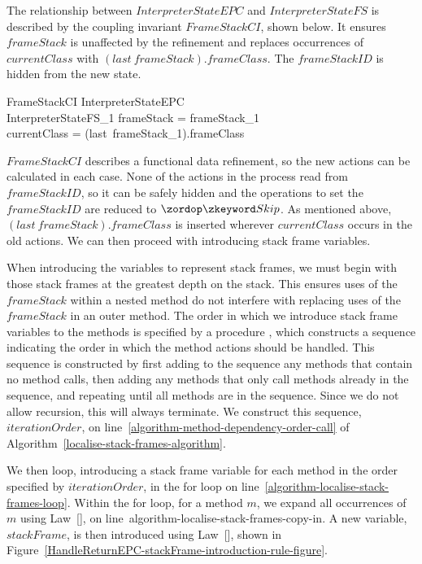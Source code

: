 The relationship between $InterpreterStateEPC$ and
$InterpreterStateFS$ is described by the coupling invariant
$FrameStackCI$, shown below.
It ensures $frameStack$ is unaffected by the refinement and replaces
occurrences of $currentClass$ with $(last~frameStack).frameClass$.
The $frameStackID$ is hidden from the new state.
\begin{schema}{FrameStackCI}
  InterpreterStateEPC \\
  InterpreterStateFS_1
\where
  frameStack = frameStack_1 \\
  currentClass = (last~frameStack_1).frameClass
\end{schema}

$FrameStackCI$ describes a functional data refinement, so the new
actions can be calculated in each case.
None of the actions in the process read from $frameStackID$, so it can
be safely hidden and the operations to set the $frameStackID$ are
reduced to $\Skip$.
As mentioned above, $(last~frameStack).frameClass$ is inserted
wherever $currentClass$ occurs in the old actions.
We can then proceed with introducing stack frame variables.

When introducing the variables to represent stack frames, we must
begin with those stack frames at the greatest depth on the stack.
This ensures uses of the $frameStack$ within a nested method do not
interfere with replacing uses of the $frameStack$ in an outer method.
The order in which we introduce stack frame variables to the methods
is specified by a procedure ,
which constructs a sequence indicating the order in which the method
actions should be handled.
This sequence is constructed by first adding to the sequence any
methods that contain no method calls, then adding any methods that
only call methods already in the sequence, and repeating until all
methods are in the sequence.
Since we do not allow recursion, this will always terminate.
We construct this sequence, $iterationOrder$, on
line~\ref{algorithm-method-dependency-order-call} of
Algorithm~\ref{localise-stack-frames-algorithm}.

We then loop, introducing a stack frame variable for each method in
the order specified by $iterationOrder$, in the for loop on
line~\ref{algorithm-localise-stack-frames-loop}.
Within the for loop, for a method $m$, we expand all occurrences of
$m$ using Law~[], on
line~{algorithm-localise-stack-frames-copy-in}.
A new variable, $stackFrame$, is then introduced using
Law~[], shown in
Figure~\ref{HandleReturnEPC-stackFrame-introduction-rule-figure}.

